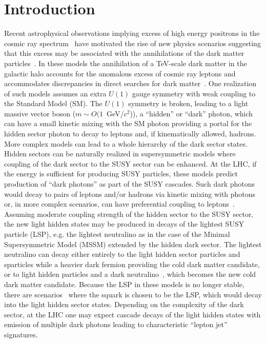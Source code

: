 \section{Introduction}
\label{sec:intro}

Recent astrophysical observations implying excess of high energy positrons in the cosmic ray spectrum~\cite{Pamela-positron} have motivated the rise of new physics scenarios suggesting that this excess may be associated with the annihilations of the dark matter particles~\cite{Arkani-Hamed}. In these models the annihilation of a TeV-scale dark 
matter in the galactic halo accounts for the anomalous 
excess of cosmic ray leptons and accommodates discrepancies in direct searches for dark 
matter~\cite{Dama}. One realization of such models assumes an extra $U(1)$ gauge symmetry with weak 
coupling to the Standard Model (SM). The $U(1)$ symmetry is broken, leading to a light massive vector boson 
($m \sim O(1$~GeV/$c^2$)), a ``hidden'' or ``dark'' photon, which can have a small kinetic mixing with the SM photon 
providing a portal for the hidden sector photon to decay to leptons and, if kinematically allowed, hadrons. More complex 
models can lead to a whole hierarchy of the dark sector states. Hidden sectors can be naturally realized in 
supersymmetric models  where coupling of the dark sector to the SUSY sector can be enhanced. At the LHC,
if the energy is sufficient for producing SUSY particles, these models predict production of ``dark photons'' as part
of the SUSY cascades. Such dark photons would decay to pairs of leptons and/or hadrons via kinetic mixing
with photons or, in more complex scenarios, can have preferential coupling to leptons~\cite{mediator-lepton-coupling2}. Assuming moderate coupling 
strength of the hidden sector to the SUSY sector, the new light hidden states may be produced in decays of the 
lightest SUSY particle (LSP), e.g. the lightest neutralino as in the case of the Minimal Supersymmetric Model (MSSM) 
extended by the hidden dark sector. The lightest neutralino can decay either entirely to the light hidden sector particles
and sparticles while a heavier dark fermion providing the cold dark matter candidate, or to light hidden particles 
and a dark neutralino~\cite{BaiHan}, which becomes the new cold dark matter candidate. Because the LSP
in these models is no longer stable, there are scenarios~\cite{Ruderman} where the squark is chosen to be 
the LSP, which would decay into the light hidden sector states. Depending on the complexity of the dark sector,
at the LHC one may expect cascade decays of the light hidden states with emission of multiple dark photons 
leading to characteristic ``lepton jet'' signatures.

